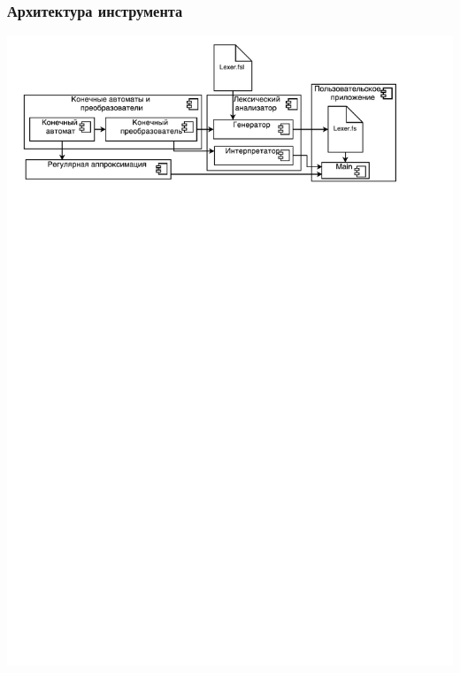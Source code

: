 \documentclass{beamer}
\begin{document}
\begin{frame}
\transwipe[direction=90]
\frametitle{Архитектура инструмента}
\begin{center}
   {\includegraphics[width=1.0\linewidth]{LexerArch}}
\end{center}
\end{frame}
\end{document}
